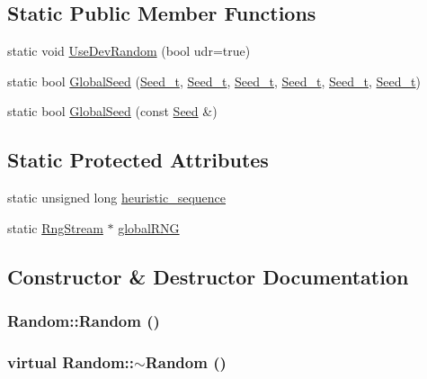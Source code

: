 \subsection*{Static Public Member Functions}
\begin{CompactItemize}
\item 
static void \hyperlink{classRandom_3634f94bc30d04479d5fc7aeaadb00d8}{UseDevRandom} (bool udr=true)
\item 
static bool \hyperlink{classRandom_1e80a206ef4c02260fb488cf02990d55}{GlobalSeed} (\hyperlink{rng_8hpp_d06dc1c21590adf4036ea4a265d06af8}{Seed\_\-t}, \hyperlink{rng_8hpp_d06dc1c21590adf4036ea4a265d06af8}{Seed\_\-t}, \hyperlink{rng_8hpp_d06dc1c21590adf4036ea4a265d06af8}{Seed\_\-t}, \hyperlink{rng_8hpp_d06dc1c21590adf4036ea4a265d06af8}{Seed\_\-t}, \hyperlink{rng_8hpp_d06dc1c21590adf4036ea4a265d06af8}{Seed\_\-t}, \hyperlink{rng_8hpp_d06dc1c21590adf4036ea4a265d06af8}{Seed\_\-t})
\item 
static bool \hyperlink{classRandom_5ad9a6dc6be2a2a6c0dd8451fa51b10c}{GlobalSeed} (const \hyperlink{classSeed}{Seed} \&)
\end{CompactItemize}
\subsection*{Static Protected Attributes}
\begin{CompactItemize}
\item 
static unsigned long \hyperlink{classRandom_b24de55aa07bfe9c066f5651e29f2b73}{heuristic\_\-sequence}
\item 
static \hyperlink{classRngStream}{RngStream} $\ast$ \hyperlink{classRandom_a6d4b3eed1223426d6267808c6111b1f}{globalRNG}
\end{CompactItemize}


\subsection{Constructor \& Destructor Documentation}
\hypertarget{classRandom_cb76b49c3903a3c4fb67fd216341f08d}{
\subsubsection[{Random}]{\setlength{\rightskip}{0pt plus 5cm}Random::Random ()}}
\label{classRandom_cb76b49c3903a3c4fb67fd216341f08d}


\hypertarget{classRandom_488c376fe5b7430d5551e44eead99e36}{
\subsubsection[{$\sim$Random}]{\setlength{\rightskip}{0pt plus 5cm}virtual Random::$\sim$Random ()}}
\label{classRandom_488c376fe5b7430d5551e44eead99e36}




